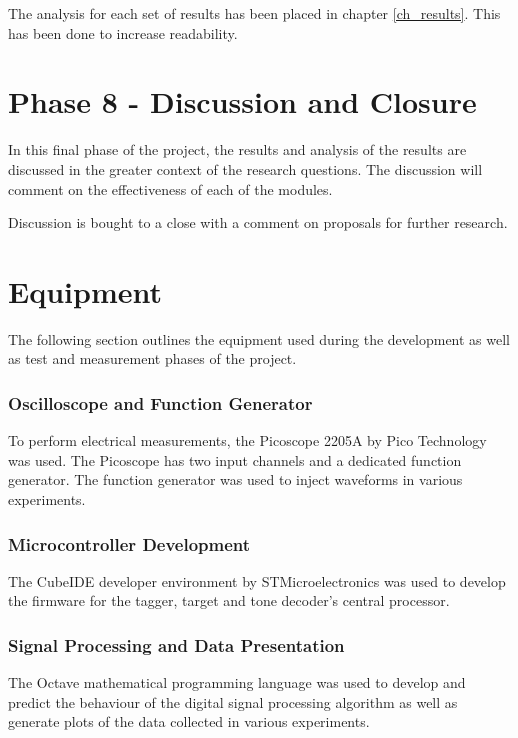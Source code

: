 The analysis for each set of results has been placed in chapter \ref{ch_results}. This has been done to increase readability.



\section{Phase 8 - Discussion and Closure}

In this final phase of the project, the results and analysis of the results are discussed in the greater context of the research questions. The discussion will comment on the effectiveness of each of the modules. 

Discussion is bought to a close with a comment on proposals for further research.




\section{Equipment}
\label{sec:test_and_measurement_equipment}
The following section outlines the equipment used during the development as well as test and measurement phases of the project.

\subsubsection{Oscilloscope and Function Generator}
To perform electrical measurements, the Picoscope 2205A by Pico Technology was used. The Picoscope has two input channels and a dedicated function generator. The function generator was used to inject waveforms in various experiments.

\subsubsection{Microcontroller Development}
The CubeIDE developer environment by STMicroelectronics was used to develop the firmware for the tagger, target and tone decoder's central processor.

\subsubsection{Signal Processing and Data Presentation}
The Octave mathematical programming language was used to develop and predict the behaviour of the digital signal processing algorithm as well as generate plots of the data collected in various experiments.

